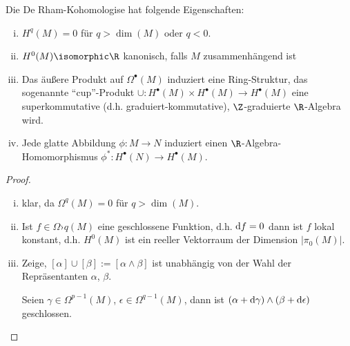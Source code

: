 \begin{lem} \label{6.16}
    Die De Rham-Kohomologise hat folgende Eigenschaften:
    \begin{enumerate}[(i)]
        \item
            $H^q(M) = 0$ für $q > \dim(M)$ oder $q < 0$.
        \item
            $H^0(M) \isomorphic \R$ kanonisch, falls $M$ zusammenhängend ist
        \item
            Das äußere Produkt auf $\Omega^\bullet(M)$ induziert eine Ring-Struktur, das sogenannte “cup”-Produkt $\cup: H^\bullet(M) \times H^\bullet(M) \to H^\bullet(M)$ eine superkommutative (d.h. graduiert-kommutative), $\Z$-graduierte $\R$-Algebra wird.
        \item
            Jede glatte Abbildung $\phi: M \to N$ induziert einen $\R$-Algebra-Homomorphismus
            \begin{math}
                \phi^*: H^\bullet(N) \to H^\bullet(M).
            \end{math}
    \end{enumerate}
    \begin{proof}
        \begin{enumerate}[(i)]
            \item
                klar, da $\Omega^q(M) = 0$ für $q > \dim(M)$.
            \item
                Ist $f \in \Omega›q(M)$ eine geschlossene Funktion, d.h. $\mathrm{d} f = 0$ dann ist $f$ lokal konstant, d.h.
                $H^0(M)$ ist ein reeller Vektorraum der Dimension $|\pi_0(M)|$.
            \item
                Zeige, $[\alpha] \cup [\beta] := [\alpha \wedge \beta]$ ist unabhängig von der Wahl der Repräsentanten $\alpha$, $\beta$.

                Seien $\gamma \in \Omega^{p-1}(M)$, $\epsilon \in \Omega^{q-1}(M)$, dann ist
                $(\alpha + \mathrm{d} \gamma) \wedge (\beta + \mathrm{d} \epsilon)$ geschlossen.


\end{enumerate}
\end{proof}
\end{lem}
